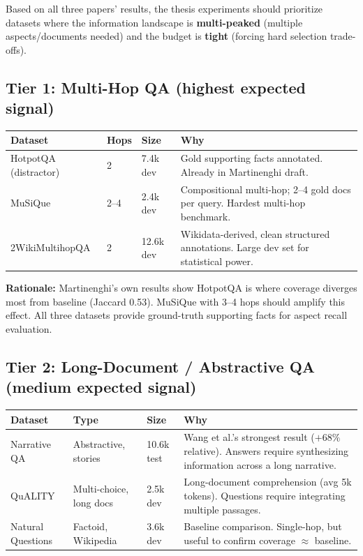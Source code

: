\documentclass[11pt,a4paper]{article}
\begin{document}
Based on all three papers' results, the thesis experiments should prioritize datasets where the information landscape is \textbf{multi-peaked} (multiple aspects/documents needed) and the budget is \textbf{tight} (forcing hard selection trade-offs).

\subsection{Tier 1: Multi-Hop QA (highest expected signal)}

\begin{tabular}{@{}lp{3.5cm}p{2cm}p{5cm}@{}}
	\toprule
	Dataset & Hops & Size & Why \\
	\midrule
	HotpotQA (distractor) & 2 & 7.4k dev & Gold supporting facts annotated. Already in Martinenghi draft. \\
	MuSiQue & 2--4 & 2.4k dev & Compositional multi-hop; 2--4 gold docs per query. Hardest multi-hop benchmark. \\
	2WikiMultihopQA & 2 & 12.6k dev & Wikidata-derived, clean structured annotations. Large dev set for statistical power. \\
	\bottomrule
\end{tabular}

\medskip
\noindent\textbf{Rationale:} Martinenghi's own results show HotpotQA is where coverage diverges most from baseline (Jaccard 0.53). MuSiQue with 3--4 hops should amplify this effect. All three datasets provide ground-truth supporting facts for aspect recall evaluation.

\subsection{Tier 2: Long-Document / Abstractive QA (medium expected signal)}

\begin{tabular}{@{}lp{3.5cm}p{2cm}p{5cm}@{}}
	\toprule
	Dataset & Type & Size & Why \\
	\midrule
	Narrative QA & Abstractive, stories & 10.6k test & Wang et al.'s strongest result ($+68\%$ relative). Answers require synthesizing information across a long narrative. \\
	QuALITY & Multi-choice, long docs & 2.5k dev & Long-document comprehension (avg 5k tokens). Questions require integrating multiple passages. \\
	Natural Questions & Factoid, Wikipedia & 3.6k dev & Baseline comparison. Single-hop, but useful to confirm coverage $\approx$ baseline. \\
	\bottomrule
\end{tabular}
\end{document}
